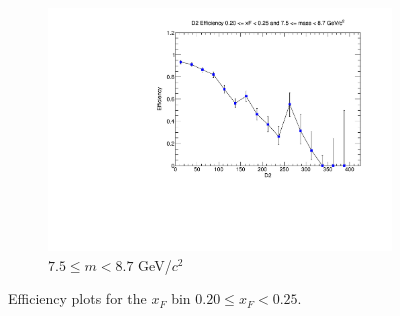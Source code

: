 \begin{figure}[p]
\begin{subfigure}[b]{0.32\textwidth}
        \includegraphics[width=\textwidth]{./kTrackerEfficiencyPlots/D2_Efficiency_xF4_mass10.pdf}
        \caption{$7.5 \leq m < 8.7$ GeV/$c^2$}
        \label{fig:xF4_mass10}
    \end{subfigure}
    \hfill
    \caption{Efficiency plots for the $x_F$ bin $0.20 \leq x_F < 0.25$.}
    \label{fig:xF4}
\end{figure}

\clearpage

